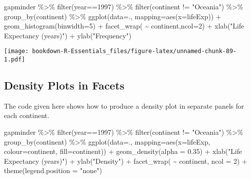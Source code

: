\documentclass[
]{book}
\newenvironment{Shaded}{\begin{snugshade}}{\end{snugshade}}
\newcommand{\AttributeTok}[1]{\textcolor[rgb]{0.77,0.63,0.00}{#1}}
\newcommand{\DecValTok}[1]{\textcolor[rgb]{0.00,0.00,0.81}{#1}}
\newcommand{\FloatTok}[1]{\textcolor[rgb]{0.00,0.00,0.81}{#1}}
\newcommand{\FunctionTok}[1]{\textcolor[rgb]{0.00,0.00,0.00}{#1}}
\newcommand{\NormalTok}[1]{#1}
\newcommand{\SpecialCharTok}[1]{\textcolor[rgb]{0.00,0.00,0.00}{#1}}
\newcommand{\StringTok}[1]{\textcolor[rgb]{0.31,0.60,0.02}{#1}}
\begin{document}
\begin{Shaded}
\begin{Highlighting}[]
\NormalTok{gapminder }\SpecialCharTok{\%\textgreater{}\%} 
  \FunctionTok{filter}\NormalTok{(year}\SpecialCharTok{==}\DecValTok{1997}\NormalTok{) }\SpecialCharTok{\%\textgreater{}\%} 
  \FunctionTok{filter}\NormalTok{(continent }\SpecialCharTok{!=} \StringTok{"Oceania"}\NormalTok{) }\SpecialCharTok{\%\textgreater{}\%} 
  \FunctionTok{group\_by}\NormalTok{(continent) }\SpecialCharTok{\%\textgreater{}\%}
\FunctionTok{ggplot}\NormalTok{(}\AttributeTok{data=}\NormalTok{., }\AttributeTok{mapping=}\FunctionTok{aes}\NormalTok{(}\AttributeTok{x=}\NormalTok{lifeExp)) }\SpecialCharTok{+} 
  \FunctionTok{geom\_histogram}\NormalTok{(}\AttributeTok{binwidth=}\DecValTok{5}\NormalTok{) }\SpecialCharTok{+} 
  \FunctionTok{facet\_wrap}\NormalTok{( }\SpecialCharTok{\textasciitilde{}}\NormalTok{ continent,}\AttributeTok{ncol=}\DecValTok{2}\NormalTok{) }\SpecialCharTok{+} 
  \FunctionTok{xlab}\NormalTok{(}\StringTok{"Life Expectancy (years)"}\NormalTok{) }\SpecialCharTok{+}
  \FunctionTok{ylab}\NormalTok{(}\StringTok{"Frequency"}\NormalTok{)}
\end{Highlighting}
\end{Shaded}

\texttt{[image: bookdown-R-Essentials\_files/figure-latex/unnamed-chunk-89-1.pdf]}

\hypertarget{density-plots-in-facets}{%
\subsection{Density Plots in Facets}\label{density-plots-in-facets}}

The code given here shows how to produce a density plot in separate panels for each continent.

\begin{Shaded}
\begin{Highlighting}[]
\NormalTok{gapminder }\SpecialCharTok{\%\textgreater{}\%} 
  \FunctionTok{filter}\NormalTok{(year}\SpecialCharTok{==}\DecValTok{1997}\NormalTok{) }\SpecialCharTok{\%\textgreater{}\%} 
  \FunctionTok{filter}\NormalTok{(continent }\SpecialCharTok{!=} \StringTok{"Oceania"}\NormalTok{) }\SpecialCharTok{\%\textgreater{}\%} 
  \FunctionTok{group\_by}\NormalTok{(continent) }\SpecialCharTok{\%\textgreater{}\%}
\FunctionTok{ggplot}\NormalTok{(}\AttributeTok{data=}\NormalTok{., }\AttributeTok{mapping=}\FunctionTok{aes}\NormalTok{(}\AttributeTok{x=}\NormalTok{lifeExp, }\AttributeTok{colour=}\NormalTok{continent, }\AttributeTok{fill=}\NormalTok{continent)) }\SpecialCharTok{+} 
  \FunctionTok{geom\_density}\NormalTok{(}\AttributeTok{alpha =} \FloatTok{0.35}\NormalTok{) }\SpecialCharTok{+} 
  \FunctionTok{xlab}\NormalTok{(}\StringTok{"Life Expectancy (years)"}\NormalTok{) }\SpecialCharTok{+}
  \FunctionTok{ylab}\NormalTok{(}\StringTok{"Density"}\NormalTok{) }\SpecialCharTok{+}
  \FunctionTok{facet\_wrap}\NormalTok{( }\SpecialCharTok{\textasciitilde{}}\NormalTok{ continent, }\AttributeTok{ncol =} \DecValTok{2}\NormalTok{) }\SpecialCharTok{+}  
  \FunctionTok{theme}\NormalTok{(}\AttributeTok{legend.position =} \StringTok{"none"}\NormalTok{)}
\end{Highlighting}
\end{Shaded}
\end{document}
